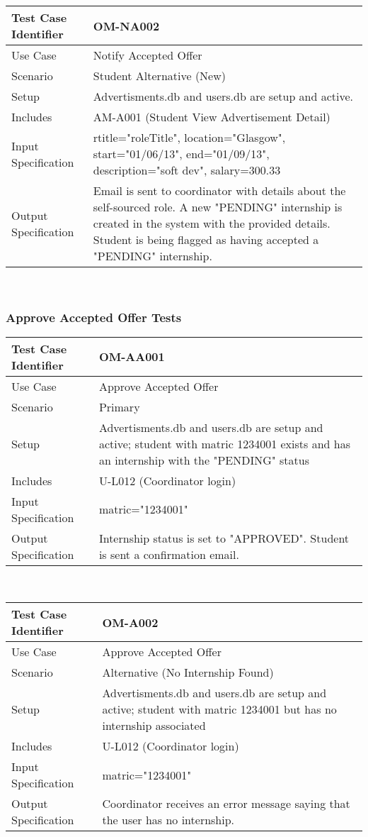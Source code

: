 \documentclass{l3deliverable}
\begin{document}
\begin{tabular}{lp{10cm}}
\hline 
\textbf{Test Case Identifier} & OM-NA002\tabularnewline
\hline 
\hline 
Use Case & Notify Accepted Offer \tabularnewline
\hline 
Scenario & Student Alternative (New) \tabularnewline
\hline 
Setup & Advertisments.db and users.db are setup and active.\tabularnewline
\hline 
Includes & AM-A001 (Student View Advertisement Detail) \tabularnewline
\hline 
Input Specification & rtitle="roleTitle", location="Glasgow", start="01/06/13", end="01/09/13", description="soft dev", salary=300.33 \tabularnewline
\hline 
Output Specification & Email is sent to coordinator with details about the self-sourced role. A new "PENDING" internship is created in the system with the provided details. Student is being flagged as having accepted a "PENDING" internship.\tabularnewline
\hline 
\end{tabular}\\

\subsubsection{Approve Accepted Offer Tests}

\begin{tabular}{lp{10cm}}
\hline 
\textbf{Test Case Identifier} & OM-AA001\tabularnewline
\hline 
\hline 
Use Case & Approve Accepted Offer\tabularnewline
\hline 
Scenario & Primary \tabularnewline
\hline 
Setup & Advertisments.db and users.db are setup and active; student with matric 1234001 exists and has an internship with the "PENDING" status\tabularnewline
\hline 
Includes & U-L012 (Coordinator login) \tabularnewline
\hline 
Input Specification &  matric="1234001" \tabularnewline
\hline 
Output Specification & Internship status is set to "APPROVED". Student is sent a confirmation email.\tabularnewline
\hline 
\end{tabular}\\


\begin{tabular}{lp{10cm}}
\hline 
\textbf{Test Case Identifier} & OM-A002\tabularnewline
\hline 
\hline 
Use Case & Approve Accepted Offer\tabularnewline
\hline 
Scenario & Alternative (No Internship Found) \tabularnewline
\hline 
Setup & Advertisments.db and users.db are setup and active; student with matric 1234001 but has no internship associated\tabularnewline
\hline 
Includes & U-L012 (Coordinator login) \tabularnewline
\hline 
Input Specification &  matric="1234001" \tabularnewline
\hline 
Output Specification & Coordinator receives an error message saying that the user has no internship. \tabularnewline
\hline 
\end{tabular}\\
\end{document}
